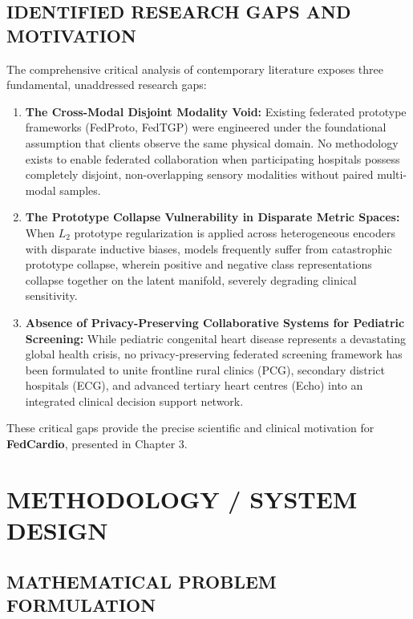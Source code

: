 \documentclass[12pt,a4paper]{amritareport}
\begin{document}
\section{IDENTIFIED RESEARCH GAPS AND MOTIVATION}

The comprehensive critical analysis of contemporary literature exposes three fundamental, unaddressed research gaps:
\begin{enumerate}
	\item \textbf{The Cross-Modal Disjoint Modality Void:} Existing federated prototype frameworks (FedProto, FedTGP) were engineered under the foundational assumption that clients observe the same physical domain. No methodology exists to enable federated collaboration when participating hospitals possess completely disjoint, non-overlapping sensory modalities without paired multi-modal samples.
	\item \textbf{The Prototype Collapse Vulnerability in Disparate Metric Spaces:} When $L_2$ prototype regularization is applied across heterogeneous encoders with disparate inductive biases, models frequently suffer from catastrophic prototype collapse, wherein positive and negative class representations collapse together on the latent manifold, severely degrading clinical sensitivity.
	\item \textbf{Absence of Privacy-Preserving Collaborative Systems for Pediatric Screening:} While pediatric congenital heart disease represents a devastating global health crisis, no privacy-preserving federated screening framework has been formulated to unite frontline rural clinics (PCG), secondary district hospitals (ECG), and advanced tertiary heart centres (Echo) into an integrated clinical decision support network.
\end{enumerate}

These critical gaps provide the precise scientific and clinical motivation for \textbf{FedCardio}, presented in Chapter 3.



\chapter{METHODOLOGY / SYSTEM DESIGN}

\section{MATHEMATICAL PROBLEM FORMULATION}
\end{document}

